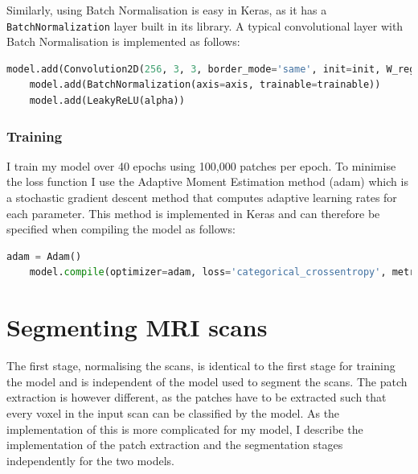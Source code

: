 \documentclass[12pt,a4paper,twoside,openright]{report}
\begin{document}
Similarly, using Batch Normalisation is easy in Keras, as it has a \texttt{BatchNormalization} layer built in its library. A typical convolutional layer with Batch Normalisation is implemented as follows:
\begin{lstlisting}[language=Python]
	model.add(Convolution2D(256, 3, 3, border_mode='same', init=init, W_regularizer=l2(l)))
	model.add(BatchNormalization(axis=axis, trainable=trainable))
	model.add(LeakyReLU(alpha))
\end{lstlisting}

\subsubsection{Training}
I train my model over 40 epochs using 100,000 patches per epoch. To minimise the loss function I use the Adaptive Moment Estimation method (adam) \cite{adam} which is a stochastic gradient descent method that computes adaptive learning rates for each parameter. This method is implemented in Keras and can therefore be specified when compiling the model as follows:
\begin{lstlisting}[language=Python]
	adam = Adam()
    model.compile(optimizer=adam, loss='categorical_crossentropy', metrics=['accuracy'])
\end{lstlisting}

\section{Segmenting MRI scans}
The first stage, normalising the scans, is identical to the first stage for training the model and is independent of the model used to segment the scans. The patch extraction is however different, as the patches have to be extracted such that every voxel in the input scan can be classified by the model. As the implementation of this is more complicated for my model, I describe the implementation of the patch extraction and the segmentation stages independently for the two models.
\end{document}
